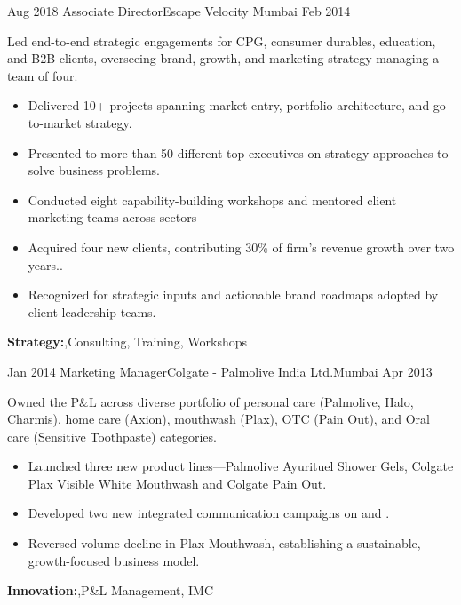 \begin{experiences}
  \experience
    {Aug 2018}     {Associate Director}{Escape Velocity} {Mumbai} 
    {Feb 2014}    {
Led end-to-end strategic engagements for CPG, consumer durables, education, and B2B clients, overseeing brand, growth, and marketing strategy managing a team of four.
                      \begin{itemize}
        \item {Delivered 10+ projects spanning market entry, portfolio architecture, and go-to-market strategy.}
        \item {Presented to more than 50 different top executives on strategy approaches to solve business problems.}
        \item {Conducted eight capability-building workshops and mentored client marketing teams across sectors}
        \item {Acquired four new clients, contributing 30\% of firm’s revenue growth over two years..}
        \item {Recognized for strategic inputs and actionable brand roadmaps adopted by client leadership teams.}                                                              
                      \end{itemize}
                    }
        {\textbf{Strategy:},Consulting, Training, Workshops} 
  \emptySeparator

  \experience
    {Jan 2014}     {Marketing Manager}{Colgate - Palmolive India Ltd.}{Mumbai}
    {Apr 2013}    {
Owned the P\&L across diverse portfolio of personal care (Palmolive, Halo, Charmis), home care (Axion), mouthwash (Plax), OTC (Pain Out), and Oral care (Sensitive Toothpaste) categories. 
                      \begin{itemize}
        \item {Launched three new product lines—Palmolive Ayurituel Shower Gels, Colgate Plax Visible White Mouthwash and Colgate Pain Out.}
        \item {Developed two new integrated communication campaigns on {} and {}.}
        \item {Reversed volume decline in  Plax Mouthwash, establishing a sustainable, growth-focused business model.}
                      \end{itemize}
                    }
        {\textbf{Innovation:},P\&L Management, IMC} 
  \emptySeparator


\end{experiences}
